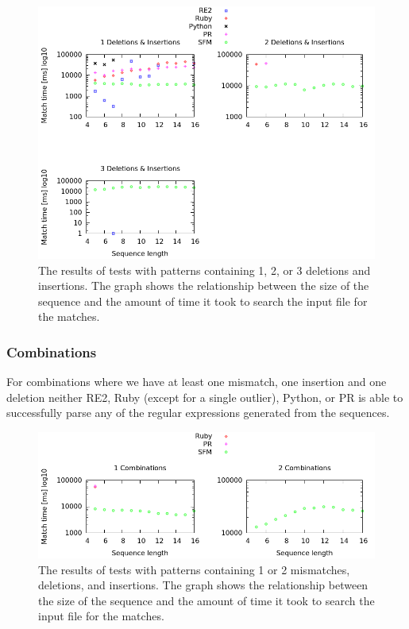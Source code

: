 \documentclass[12pt]{article}
\theoremstyle{definition}
\begin{document}
\begin{figure}[H]
	\begin{center}
		\includegraphics[scale=0.55]{graphs/deletions_insertions.png}	
	\end{center}
	\caption{The results of tests with patterns containing 1, 2, or 3 deletions and insertions. The graph shows the relationship between the size of the sequence and the amount of time it took to search the input file for the matches.}
	\label{graph:cases:combinations}
\end{figure}

\subsubsection{Combinations}

For combinations where we have at least one mismatch, one insertion and one deletion neither RE2, Ruby (except for a single outlier), Python, or PR is able to successfully parse any of the regular expressions generated from the sequences.

\begin{figure}[H]
	\begin{center}
		\includegraphics[scale=0.55]{graphs/combinations.png}	
	\end{center}
	\caption{The results of tests with patterns containing 1 or 2 mismatches, deletions, and insertions. The graph shows the relationship between the size of the sequence and the amount of time it took to search the input file for the matches.}
	\label{graph:cases:combinations}
\end{figure}
\end{document}
